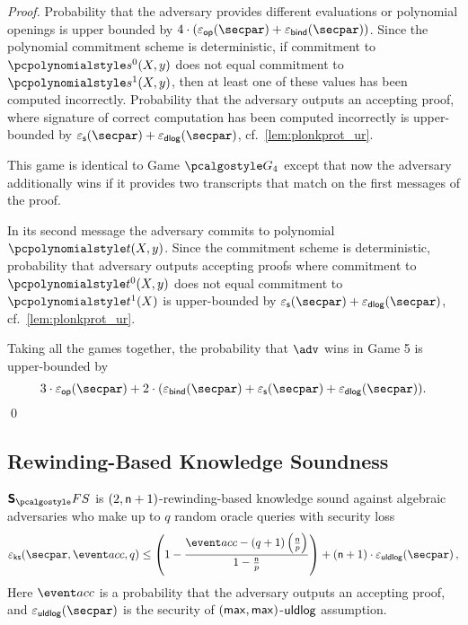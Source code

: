 \begin{proof}
  Probability that the adversary provides different evaluations or polynomial openings is
  upper bounded by $4 \cdot (\epsop (\secpar) + \epsbind (\secpar))$. Since the polynomial
  commitment scheme is deterministic, if commitment to $\p{s^0} (X, y)$ does not equal
  commitment to $\p{s^1} (X, y)$, then at least one of these values has been computed
  incorrectly. Probability that the adversary outputs an accepting proof, where signature
  of correct computation has been computed incorrectly is upper-bounded by $\epss
  (\secpar) + \epsdlog (\secpar)$, cf.~\cref{lem:plonkprot_ur}.

    This game is identical to Game $\game{4}$ except that now the
  adversary additionally wins if it provides two transcripts that match on the
  first messages of the proof.

   In its second message the adversary commits to polynomial
  $\p{t} (X, y)$. Since the commitment scheme is deterministic, probability that adversary
  outputs accepting proofs where commitment to $\p{t^0} (X, y)$ does not equal commitment
  to $\p{t^1} (X)$ is upper-bounded by $\epss (\secpar) + \epsdlog (\secpar)$, cf.~\cref{lem:plonkprot_ur}.

   Taking all the games together, the probability that $\adv$ wins
  in Game 5 is upper-bounded by
  \[
    3 \cdot \epsop (\secpar) + 2 \cdot (\epsbind (\secpar) + \epss (\secpar) +
    \epsdlog (\secpar)).
  \]
  \fi
  \qed
\end{proof}

\subsection{Rewinding-Based Knowledge Soundness}
\begin{lemma}
	\label{lem:sonicprot_ss}
  $\sonicprotfs$ is $(2, \mathsf{n} + 1)$-rewinding-based knowledge sound against algebraic adversaries who make up to $q$ random oracle queries with security loss 
  \[
    \epscss(\secpar,\accProb, q) \leq \left(1 - \frac{\accProb - (q + 1) \left( \frac{\noofc}{p}\right)}{1 - \frac{\noofc}{p}}\right) + (\noofc + 1) \cdot \epsuldlog (\secpar)\,,
  \]
	Here $\accProb$ is a probability that the adversary outputs an accepting proof, and $\epsuldlog(\secpar)$ is the security of $(\mathsf{max}, \mathsf{max})$-$\mathsf{uldlog}$ assumption.
\end{lemma}



